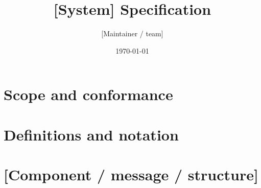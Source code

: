 \documentclass[11pt]{article}
\title{[System] Specification}
\author{[Maintainer / team]}
\date{\today}
\begin{document}
\maketitle
\tableofcontents

\section{Scope and conformance}

\section{Definitions and notation}

\section{[Component / message / structure]}
\end{document}
